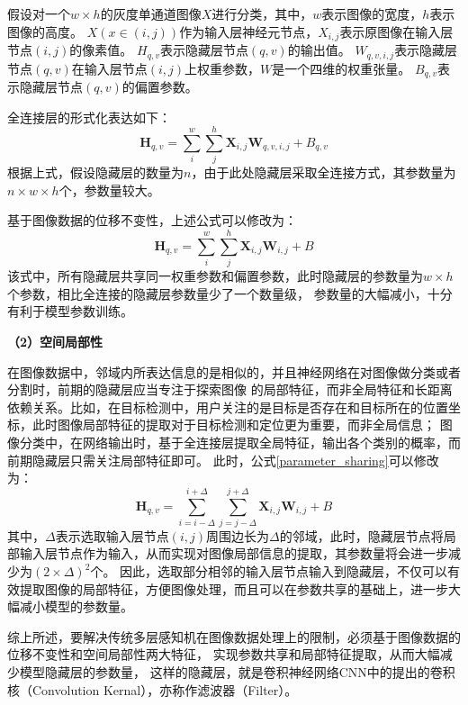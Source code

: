 假设对一个$w\times{h}$的灰度单通道图像$X$进行分类，其中，$w$表示图像的宽度，$h$表示图像的高度。
$X(x\in{(i,j)})$作为输入层神经元节点，$X_{i,j}$表示原图像在输入层节点$(i,j)$的像素值。
$H_{q,v}$表示隐藏层节点$(q,v)$的输出值。
${W}_{q,v,i,j}$表示隐藏层节点$(q,v)$在输入层节点$(i,j)$上权重参数，$W$是一个四维的权重张量。
$B_{q,v}$表示隐藏层节点$(q,v)$的偏置参数。

全连接层的形式化表达如下：
\begin{equation}
	\bm{H}_{q,v} = \sum_{i}^{w}\sum_{j}^{h}\bm{X}_{i,j}\bm{W}_{q,v,i,j} + B_{q,v}
\end{equation}
根据上式，假设隐藏层的数量为$n$，由于此处隐藏层采取全连接方式，其参数量为$n\times{w}\times{h}$个，参数量较大。

基于图像数据的位移不变性，上述公式可以修改为：
\begin{equation}
	\bm{H}_{q,v} = \sum_{i}^{w}\sum_{j}^{h}\bm{X}_{i,j}\bm{W}_{i,j} + B
	\label{parameter_sharing}
\end{equation}
该式中，所有隐藏层共享同一权重参数和偏置参数，此时隐藏层的参数量为$w\times{h}$个参数，相比全连接的隐藏层参数量少了一个数量级，
参数量的大幅减小，十分有利于模型参数训练。

\textbf{（2）空间局部性}

在图像数据中，邻域内所表达信息的是相似的，并且神经网络在对图像做分类或者分割时，前期的隐藏层应当专注于探索图像
的局部特征，而非全局特征和长距离依赖关系。比如，在目标检测中，用户关注的是目标是否存在和目标所在的位置坐标，此时图像局部特征的提取对于目标检测和定位更为重要，而非全局信息；
图像分类中，在网络输出时，基于全连接层提取全局特征，输出各个类别的概率，而前期隐藏层只需关注局部特征即可。
此时，公式\ref{parameter_sharing}可以修改为：
\begin{equation}
	\bm{H}_{q,v} = \sum_{i=i-\Delta}^{i+\Delta}\sum_{j=j-\Delta}^{j+\Delta}\bm{X}_{i,j}\bm{W}_{i,j} + B
\end{equation}
其中，$\Delta$表示选取输入层节点$(i,j)$周围边长为$\Delta$的邻域，此时，隐藏层节点将局部输入层节点作为输入，从而实现对图像局部信息的提取，其参数量将会进一步减少为$(2\times{\Delta})^2$个。
因此，选取部分相邻的输入层节点输入到隐藏层，不仅可以有效提取图像的局部特征，方便图像处理，而且可以在参数共享的基础上，进一步大幅减小模型的参数量。

综上所述，要解决传统多层感知机在图像数据处理上的限制，必须基于图像数据的位移不变性和空间局部性两大特征，
实现参数共享和局部特征提取，从而大幅减少模型隐藏层的参数量，
这样的隐藏层，就是卷积神经网络CNN中的提出的卷积核（Convolution Kernal），亦称作滤波器（Filter）。

